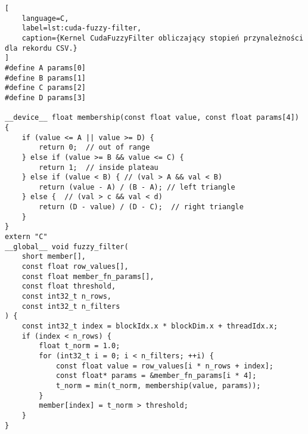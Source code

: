 \begin{lstlisting}[
    language=C,
    label=lst:cuda-fuzzy-filter,
    caption={Kernel CudaFuzzyFilter obliczający stopień przynależności dla rekordu CSV.}
]
#define A params[0]
#define B params[1]
#define C params[2]
#define D params[3]

__device__ float membership(const float value, const float params[4]) {
    if (value <= A || value >= D) {
        return 0;  // out of range
    } else if (value >= B && value <= C) {
        return 1;  // inside plateau
    } else if (value < B) { // (val > A && val < B)
        return (value - A) / (B - A); // left triangle
    } else {  // (val > c && val < d)
        return (D - value) / (D - C);  // right triangle
    }
}
extern "C"
__global__ void fuzzy_filter(
    short member[],
    const float row_values[],
    const float member_fn_params[],
    const float threshold,
    const int32_t n_rows,
    const int32_t n_filters
) {
    const int32_t index = blockIdx.x * blockDim.x + threadIdx.x;
    if (index < n_rows) {
        float t_norm = 1.0;
        for (int32_t i = 0; i < n_filters; ++i) {
            const float value = row_values[i * n_rows + index];
            const float* params = &member_fn_params[i * 4];
            t_norm = min(t_norm, membership(value, params));
        }
        member[index] = t_norm > threshold;
    }
}
\end{lstlisting}
